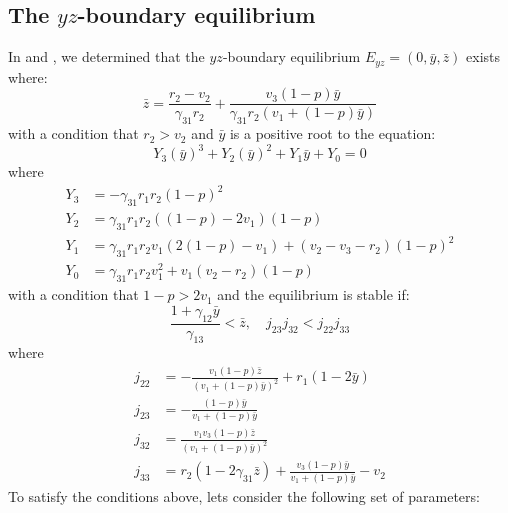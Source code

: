 \subsection{The $yz$-boundary equilibrium}\label{subsec:numsim_yz_boundary_equilibrium}
In  and , we determined that the $yz$-boundary equilibrium $E_{yz}=\left(0,\bar{y},\bar{z}\right)$ exists where:
\[
\bar{z}=\frac{r_2-v_2}{\gamma_{31}r_2}+\frac{v_3\left(1-p\right)\bar{y}}{\gamma_{31}r_2\left(v_1+\left(1-p\right)\bar{y}\right)}
\]
with a condition that $r_2>v_2$ and $\bar{y}$ is a positive root to the equation:
\begin{equation*}
    Y_3\left(\bar{y}\right)^3+Y_2\left(\bar{y}\right)^2+Y_1\bar{y}+Y_0=0
\end{equation*}
where
\begin{align*}
    Y_3 &= -\gamma_{31}r_1r_2\left(1-p\right)^2\\
    Y_2 &= \gamma_{31}r_1r_2\left(\left(1-p\right)-2v_1\right)\left(1-p\right)\\
    Y_1 &= \gamma_{31}r_1r_2v_1\left(2\left(1-p\right)-v_1\right)+\left(v_2-v_3-r_2\right)\left(1-p\right)^2\\
    Y_0 &= \gamma_{31}r_1r_2v_1^2+v_1\left(v_2-r_2\right)\left(1-p\right)
\end{align*}
with a condition that $1-p>2v_1$ and the equilibrium is stable if:
\[
\frac{1+\gamma_{12}\bar{y}}{\gamma_{13}}<\bar{z},\quad 
j_{23}j_{32}<j_{22}j_{33}
\]
where
\begin{align*}
    j_{22} &= -\frac{v_1\left(1-p\right)\bar{z}}{\left(v_1+\left(1-p\right)\bar{y}\right)^2}+r_1\left(1-2\bar{y}\right)\\
    j_{23} &= -\frac{\left(1-p\right)\bar{y}}{v_1+\left(1-p\right)\bar{y}}\\
    j_{32} &= \frac{v_1v_3\left(1-p\right)\bar{z}}{\left(v_1+\left(1-p\right)\bar{y}\right)^2}\\
    j_{33} &= r_2\left(1-2\gamma_{31}\bar{z}\right)+\frac{v_3\left(1-p\right)\bar{y}}{v_1+\left(1-p\right)\bar{y}}-v_2
\end{align*}
To satisfy the conditions above, lets consider the following set of parameters:
